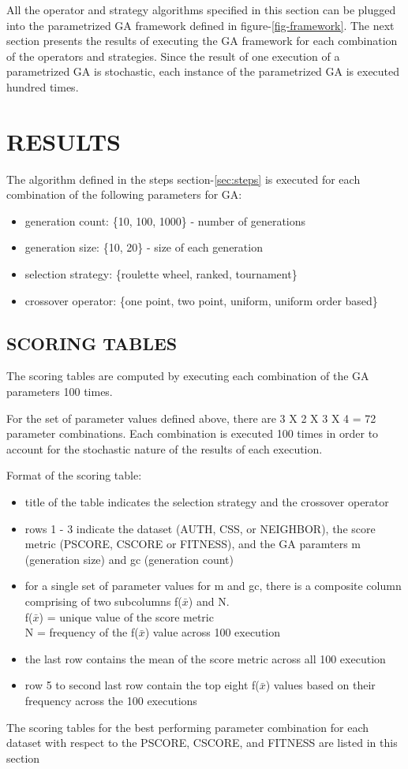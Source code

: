 \documentclass[12pt,a4paper]{article}
\begin{document}
	All the operator and strategy algorithms specified in this section can be plugged into the parametrized GA framework defined in figure-\ref{fig-framework}. The next section presents the results of executing the GA framework for each combination of the operators and strategies. Since the result of one execution of a parametrized GA is stochastic, each instance of the parametrized GA is executed hundred times.
	
	\section{\large RESULTS} \label{sec-results}
		The algorithm defined in the steps section-\ref{sec:steps} is executed for each combination of the following parameters for GA:
		\begin{itemize}
			\item generation count: \{10, 100, 1000\} - number of generations
			\item generation size: \{10, 20\} - size of each generation
			\item selection strategy: \{roulette wheel, ranked, tournament\}
			\item crossover operator: \{one point, two point, uniform, uniform order based\}
		\end{itemize}
 
	\subsection{SCORING TABLES}
	The scoring tables are computed by executing each combination of the GA parameters 100 times.\par
	For the set of parameter values defined above, there are 3 X 2 X 3 X 4 = 72 parameter combinations. Each combination is executed 100 times in order to account for the stochastic nature of the results of each execution. \par
	Format of the scoring table:
	\begin{itemize}
		\item title of the table indicates the selection strategy and the crossover operator
		\item rows 1 - 3 indicate the dataset (AUTH, CSS, or NEIGHBOR), the score metric (PSCORE, CSCORE or FITNESS), and the GA paramters m (generation size) and gc (generation count)
		\item for a single set of parameter values for m and gc, there is a composite column comprising of two subcolumns f($\bar{x}$) and N. \\
		f($\bar{x}$) = unique value of the score metric \\
		N = frequency of the f($\bar{x}$) value across 100 execution
		\item the last row contains the mean of the score metric across all 100 execution
		\item row 5 to second last row contain the top eight f($\bar{x}$) values based on their frequency across the 100 executions
	\end{itemize}
	The scoring tables for the best performing parameter combination for each dataset with respect to the PSCORE, CSCORE, and FITNESS are listed in this section
\end{document}
